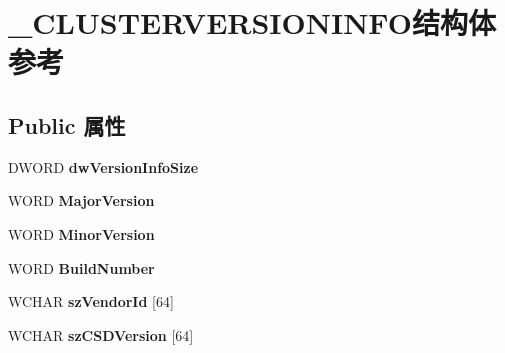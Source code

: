 \hypertarget{struct___c_l_u_s_t_e_r_v_e_r_s_i_o_n_i_n_f_o}{}\section{\+\_\+\+C\+L\+U\+S\+T\+E\+R\+V\+E\+R\+S\+I\+O\+N\+I\+N\+F\+O结构体 参考}
\label{struct___c_l_u_s_t_e_r_v_e_r_s_i_o_n_i_n_f_o}
\subsection*{Public 属性}
\begin{DoxyCompactItemize}
\item 
\mbox{\label{struct___c_l_u_s_t_e_r_v_e_r_s_i_o_n_i_n_f_o_a438b60b81b4a451b1991c0945ab5270d}} 
D\+W\+O\+RD {\bfseries dw\+Version\+Info\+Size}
\item 
\mbox{\label{struct___c_l_u_s_t_e_r_v_e_r_s_i_o_n_i_n_f_o_a61fa581c02c48fa20244619588eaac48}} 
W\+O\+RD {\bfseries Major\+Version}
\item 
\mbox{\label{struct___c_l_u_s_t_e_r_v_e_r_s_i_o_n_i_n_f_o_a6bc4ca0d10be7c0d3c98f8f4b6f71c21}} 
W\+O\+RD {\bfseries Minor\+Version}
\item 
\mbox{\label{struct___c_l_u_s_t_e_r_v_e_r_s_i_o_n_i_n_f_o_a7bcf8f0aa4a8110531a04fb2a245cf5f}} 
W\+O\+RD {\bfseries Build\+Number}
\item 
\mbox{\label{struct___c_l_u_s_t_e_r_v_e_r_s_i_o_n_i_n_f_o_aa0a6875d5fa9f33a38bf9a6fb70dfefa}} 
W\+C\+H\+AR {\bfseries sz\+Vendor\+Id} \mbox{[}64\mbox{]}
\item 
\mbox{\label{struct___c_l_u_s_t_e_r_v_e_r_s_i_o_n_i_n_f_o_af30342971e3dce284b5b2d07fefdf973}} 
W\+C\+H\+AR {\bfseries sz\+C\+S\+D\+Version} \mbox{[}64\mbox{]}
\item 
\mbox{\label{struct___c_l_u_s_t_e_r_v_e_r_s_i_o_n_i_n_f_o_aa4f1f9f5d6e192173baaaaff33ce3561}} 

\end{DoxyCompactItemize}
